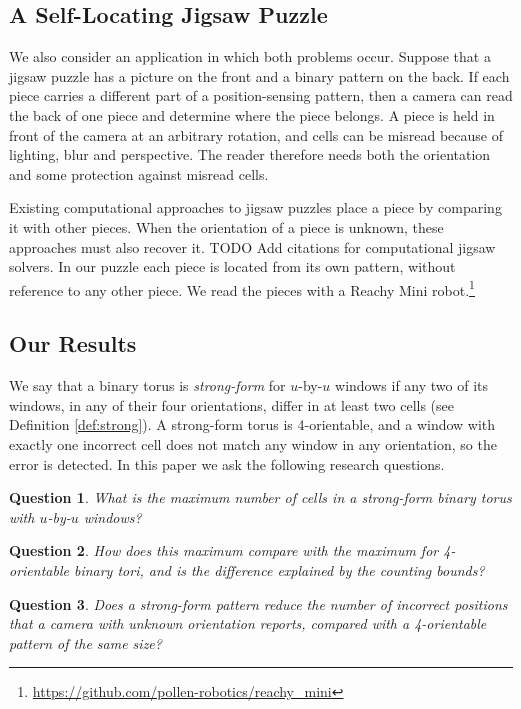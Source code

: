 \documentclass{lipics-v2021}
\newtheorem{question}{Question}
\newcommand{\todo}[1]{{\color{blue}TODO #1}}
\begin{document}
\subsection{A Self-Locating Jigsaw Puzzle}
\label{sec:intro_jigsaw}

We also consider an application in which both problems occur.
Suppose that a jigsaw puzzle has a picture on the front and a binary pattern on the back.
If each piece carries a different part of a position-sensing pattern, then a camera can read the back of one piece and determine where the piece belongs.
A piece is held in front of the camera at an arbitrary rotation, and cells can be misread because of lighting, blur and perspective.
The reader therefore needs both the orientation and some protection against misread cells.

Existing computational approaches to jigsaw puzzles place a piece by comparing it with other pieces.
When the orientation of a piece is unknown, these approaches must also recover it.
\todo{Add citations for computational jigsaw solvers.}
In our puzzle each piece is located from its own pattern, without reference to any other piece.
We read the pieces with a Reachy Mini robot.\footnote{\url{https://github.com/pollen-robotics/reachy_mini}}

\subsection{Our Results}
\label{sec:intro_results}

We say that a binary torus is \emph{strong-form} for $u$-by-$u$ windows if any two of its windows, in any of their four orientations, differ in at least two cells (see Definition \ref{def:strong}).
A strong-form torus is 4-orientable, and a window with exactly one incorrect cell does not match any window in any orientation, so the error is detected.
In this paper we ask the following research questions.

\begin{question} \label{quest:size}
What is the maximum number of cells in a strong-form binary torus with $u$-by-$u$ windows?
\end{question}

\begin{question} \label{quest:cost}
How does this maximum compare with the maximum for 4-orientable binary tori, and is the difference explained by the counting bounds?
\end{question}

\begin{question} \label{quest:reader}
Does a strong-form pattern reduce the number of incorrect positions that a camera with unknown orientation reports, compared with a 4-orientable pattern of the same size?
\end{question}
\end{document}

